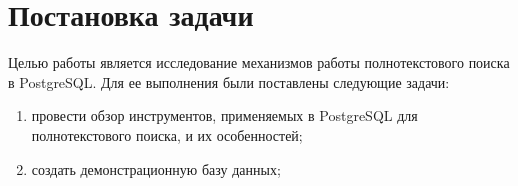 
\section{Постановка задачи}
\label{sec:task}

Целью работы является исследование механизмов работы полнотекстового поиска в PostgreSQL.
Для ее выполнения были поставлены следующие задачи:
\begin{enumerate}
    \item провести обзор инструментов, применяемых в PostgreSQL для полнотекстового поиска, и их особенностей;
    \item создать демонстрационную базу данных;
\end{enumerate}
